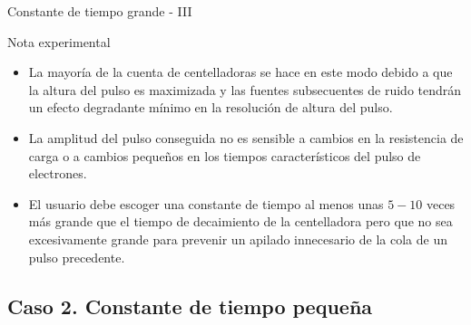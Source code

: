 \documentclass[a4paper,10pt]{beamer}
\begin{document}
\begin{frame}{Constante de tiempo grande - III}
 
 \begin{exampleblock}{Nota experimental}
  \begin{itemize}[<+->]
   \item \begin{justify}
          La mayoría de la cuenta de centelladoras se hace en este modo debido a 
          que la altura del pulso es maximizada y las fuentes subsecuentes de ruido 
          tendrán un efecto degradante mínimo en la resolución de altura del pulso.
          \end{justify}
   \item \begin{justify}
	  La amplitud del pulso conseguida no es sensible a cambios en la resistencia 
	  de carga o a cambios pequeños en los tiempos característicos del pulso 
	  de electrones.
         \end{justify}
   \item \begin{justify}
          El usuario debe escoger una constante de tiempo al menos unas $5-10$ veces 
          más grande que el tiempo de decaimiento de la centelladora pero que no sea
          excesivamente grande para prevenir un apilado innecesario de la cola de 
          un pulso precedente. 
         \end{justify}      
  \end{itemize}
 \end{exampleblock}
\end{frame}

\subsection{Caso 2. Constante de tiempo pequeña}
\end{document}
